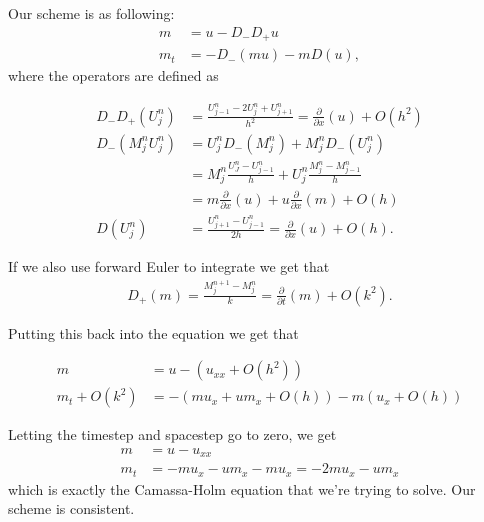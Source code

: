 Our scheme is as following:
\begin{align}
m &= u - D_- D_+ u \\
m_t &=- D_- ( m u ) - m D ( u ),
\end{align}
where the operators are defined as

\begin{align}
D_- D_+ \left( U_j^n \right)  &= \frac{U_{j-1}^n - 2 U_j^n + U_{j+1}^n}{h^2} = \frac{\partial}{\partial x} (u) + O \left( h^ 2 \right) \\
 D_- \left(M_j^n U_j^n \right) &= U_j^n D_-( M_j^n ) + M_j^n D_- (U_j^n) \\
  &= M_j^n \frac{U_J^n - U_{j-1}^n}{h} + U_j^n \frac{M_{j}^n - M_{j-1}^n}{h} \\
  &= m \frac{\partial}{\partial x} (u) + u \frac{\partial}{\partial x} (m) + O \left( h \right)  \\
D \left(U_j^n \right) &= \frac{U_{j+1}^n - U_{j-1}^n}{2h} = \frac{\partial}{\partial x} (u) + O \left( h \right).
\end{align}

If we also use forward Euler to integrate we get that
\begin{align}
D_+ (m) = \frac{M_j^{n+1} - M_j^n}{k} =  \frac{\partial}{\partial t} (m) + O(k^2).
\end{align}

Putting this back into the equation we get that

\begin{align}
m &= u - \left( u_{xx} + O\left(h^2\right) \right) \\
m_t  + O(k^2) &= - \left( m u_x + u m_x + O(h) \right) - m \left( u_x + O(h) \right)
\end{align}

Letting the timestep and spacestep go to zero, we get
\begin{align}
m &= u - u_{xx} \\
m_t &= - m u_x - u m_x - m u_x = - 2m u_x - u m_x
\end{align}
which is exactly the Camassa-Holm equation that we're trying to solve. Our scheme is consistent.